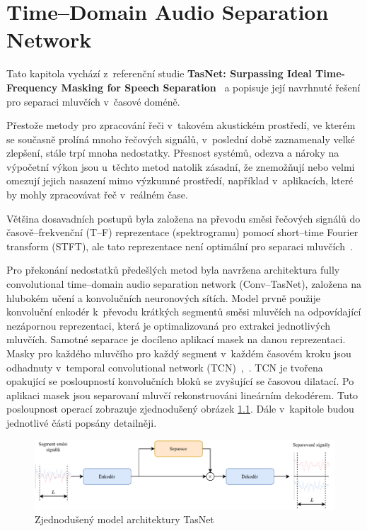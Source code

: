 \chapter{Time--Domain Audio Separation Network}
\label{tasnet}

Tato kapitola vychází z~referenční studie \textbf{TasNet: Surpassing Ideal Time-Frequency Masking for Speech Separation}~\cite{luo2018convtasnet} a popisuje její navrhnuté řešení pro separaci mluvčích v~časové doméně.

Přestože metody pro zpracování řeči v~takovém akustickém prostředí, ve kterém se současně prolíná mnoho řečových signálů, v~poslední době zaznamenaly velké zlepšení, stále trpí mnoha nedostatky. Přesnost systémů, odezva a nároky na výpočetní výkon jsou u~těchto metod natolik zásadní, že znemožňují nebo velmi omezují jejich nasazení mimo výzkumné prostředí, například v~aplikacích, které by mohly zpracovávat řeč v~reálném čase.

Většina dosavadních postupů byla založena na převodu směsi řečových signálů do časově--frekvenční (T--F) reprezentace (spektrogramu) pomocí short--time Fourier transform (STFT), ale tato reprezentace není optimální pro separaci mluvčích~\cite{speechseparationoverview}.

Pro překonání nedostatků předešlých metod byla navržena architektura fully convolutional time--domain audio separation network (Conv--TasNet), založena na hlubokém učení a konvolučních neuronových sítích. Model prvně použije konvoluční enkodér k~převodu krátkých segmentů směsi mluvčích na odpovídající nezápornou reprezentaci, která je optimalizovaná pro extrakci jednotlivých mluvčích. Samotné separace je docíleno aplikací masek na danou reprezentaci. Masky pro každého mluvčího pro každý segment v~každém časovém kroku jsou odhadnuty v~temporal convolutional network (TCN)~\cite{lea2016temporal},~\cite{bai2018empirical}. TCN je tvořena opakující se posloupností konvolučních bloků se zvyšující se časovou dilatací. Po aplikaci masek jsou separovaní mluvčí rekonstruováni lineárním dekodérem. Tuto posloupnost operací zobrazuje zjednodušený obrázek \ref{fig:tasnet-pipe}. Dále v~kapitole budou jednotlivé části popsány detailněji.

\begin{figure}[H]
    \centering
    \includegraphics[scale=0.8]{obrazky-figures/tasnet-pipe.pdf}
    \caption{\label{fig:tasnet-pipe}Zjednodušený model architektury TasNet}
\end{figure}


